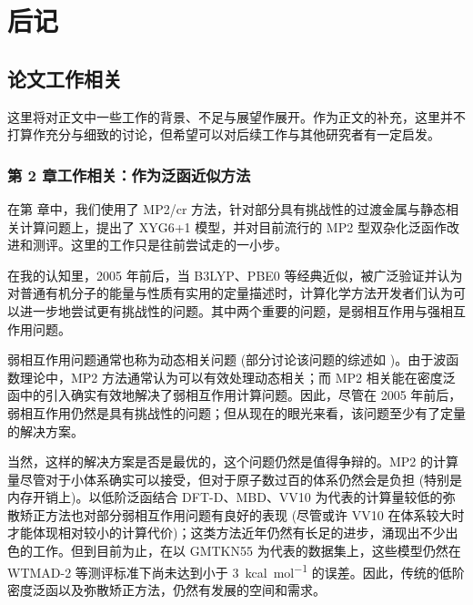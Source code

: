
\chapter{后记}

\section*{论文工作相关}

这里将对正文中一些工作的背景、不足与展望作展开。作为正文的补充，这里并不打算作充分与细致的讨论，但希望可以对后续工作与其他研究者有一定启发。

\subsection*{第 2 章工作相关：作为泛函近似方法}

在第  章中，我们使用了 MP2/cr 方法，针对部分具有挑战性的过渡金属与静态相关计算问题上，提出了 XYG6+1 模型，并对目前流行的 MP2 型双杂化泛函作改进和测评。这里的工作只是往前尝试走的一小步。

在我的认知里，2005 年前后，当 B3LYP、PBE0 等经典近似，被广泛验证并认为对普通有机分子的能量与性质有实用的定量描述时\cite{Koch-Holthausen.Wiley.2001}，计算化学方法开发者们认为可以进一步地尝试更有挑战性的问题。其中两个重要的问题，是弱相互作用与强相互作用问题。

弱相互作用问题通常也称为动态相关问题 (部分讨论该问题的综述如 )。由于波函数理论中，MP2 方法通常认为可以有效处理动态相关；而 MP2 相关能在密度泛函中的引入确实有效地解决了弱相互作用计算问题。因此，尽管在 2005 年前后，弱相互作用仍然是具有挑战性的问题；但从现在的眼光来看，该问题至少有了定量的解决方案。

当然，这样的解决方案是否是最优的，这个问题仍然是值得争辩的。MP2 的计算量尽管对于小体系确实可以接受，但对于原子数过百的体系仍然会是负担 (特别是内存开销上)。以低阶泛函结合 DFT-D\cite{Grimme-Krieg.JCP.2010, Smith-Sherrill.JPCL.2016, Caldeweyher-Grimme.JCP.2019}、MBD\cite{Tkatchenko-Scheffler.PRL.2009, Tkatchenko-Scheffler.PRL.2012}、VV10\cite{Vydrov-VanVoorhis.JCP.2010} 为代表的计算量较低的弥散矫正方法也对部分弱相互作用问题有良好的表现 (尽管或许 VV10 在体系较大时才能体现相对较小的计算代价)；这类方法近年仍然有长足的进步，涌现出不少出色的工作\cite{Kirkpatrick-Cohen.S.2021, Liu-He.NCS.2022}。但到目前为止，在以 GMTKN55 为代表的数据集上，这些模型仍然在 WTMAD-2 等测评标准下尚未达到小于 \SI{3}{kcal.mol^{-1}} 的误差。因此，传统的低阶密度泛函以及弥散矫正方法，仍然有发展的空间和需求。

